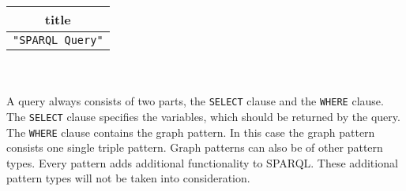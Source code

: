 \documentclass[11pt,a4paper,headsepline, bibtotoc]{scrreprt}
\begin{document}
\begin{tabular}[c]{|c|}\hline
{\sf\bf title} \\ \hline
{\tt "SPARQL Query"}\\ \hline
\end{tabular}\\ \\
A query always consists of two parts, the \texttt{SELECT} clause and the \texttt{WHERE} clause. The \texttt{SELECT} clause specifies the variables, which should be returned by the query. The \texttt{WHERE} clause contains the graph pattern. In this case the graph pattern consists one single triple pattern. Graph patterns can also be of other pattern types. Every pattern adds additional functionality to SPARQL. These additional pattern types will not be taken into consideration.\\
\end{document}
